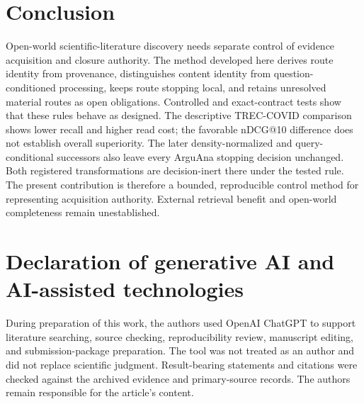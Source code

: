\documentclass[a4paper,fleqn]{cas-sc}
\theoremstyle{definition}
\begin{document}


\section{Conclusion}

Open-world scientific-literature discovery needs separate control of evidence
acquisition and closure authority. The method developed here derives route
identity from provenance, distinguishes content identity from
question-conditioned processing, keeps route stopping local, and retains
unresolved material routes as open obligations. Controlled and exact-contract
tests show that these rules behave as designed. The descriptive TREC-COVID
comparison shows lower recall and higher read cost; the favorable nDCG@10
difference does not establish overall superiority. The later density-normalized and query-conditional successors
also leave every ArguAna stopping decision unchanged. Both registered
transformations are decision-inert there under the tested rule. The present contribution is therefore a bounded, reproducible
control method for representing acquisition authority. External retrieval
benefit and open-world completeness remain unestablished.

\section*{Declaration of generative AI and AI-assisted technologies}

During preparation of this work, the authors used OpenAI ChatGPT to support
literature searching, source checking, reproducibility review, manuscript
editing, and submission-package preparation. The tool was not treated as an
author and did not replace scientific judgment. Result-bearing statements and
citations were checked against the archived evidence and primary-source
records. The authors remain responsible for the article's content.




\clearpage
\end{document}
